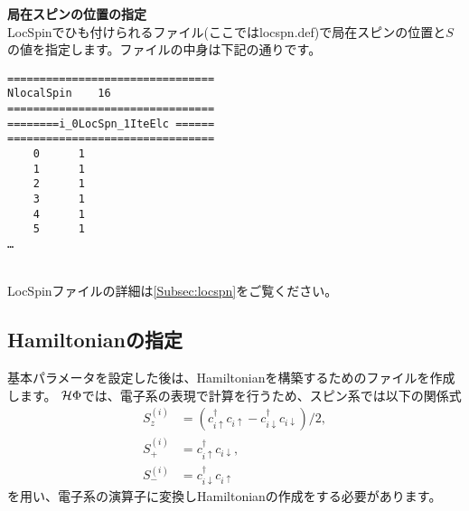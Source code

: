 \begin{description}
\item {\bf 局在スピンの位置の指定}\\
LocSpinでひも付けられるファイル(ここではlocspn.def)で局在スピンの位置と$S$の値を指定します。ファイルの中身は下記の通りです。\\
\begin{minipage}{15cm}
\begin{screen}
\begin{verbatim}
================================ 
NlocalSpin    16  
================================ 
========i_0LocSpn_1IteElc ====== 
================================ 
    0      1
    1      1
    2      1
    3      1
    4      1
    5      1
…
\end{verbatim}
\end{screen}
\end{minipage}
~\\
LocSpinファイルの詳細は\ref{Subsec:locspn}をご覧ください。
\end{description}

\subsection{Hamiltonianの指定}
基本パラメータを設定した後は、Hamiltonianを構築するためのファイルを作成します。
$\mathcal{H} \Phi$では、電子系の表現で計算を行うため、スピン系では以下の関係式
\begin{align}
S_z^{(i)}&=(c_{i\uparrow}^{\dag}c_{i\uparrow}-c_{i\downarrow}^{\dag}c_{i\downarrow})/2,\\
S_+^{(i)}&=c_{i\uparrow}^{\dag}c_{i\downarrow},\\
S_-^{(i)}&=c_{i\downarrow}^{\dag}c_{i\uparrow}
\end{align}
を用い、電子系の演算子に変換しHamiltonianの作成をする必要があります。

